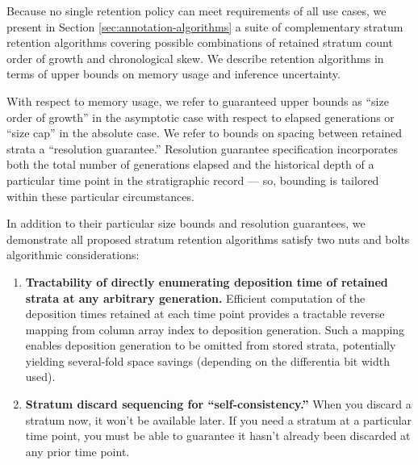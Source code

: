 Because no single retention policy can meet requirements of all use cases, we present in Section \ref{sec:annotation-algorithms} a suite of complementary stratum retention algorithms covering possible combinations of retained stratum count order of growth and chronological skew.
We describe retention algorithms in terms of upper bounds on memory usage and inference uncertainty.

With respect to memory usage, we refer to guaranteed upper bounds as ``size order of growth'' in the asymptotic case with respect to elapsed generations or ``size cap'' in the absolute case.
We refer to bounds on spacing between retained strata a ``resolution guarantee.''
Resolution guarantee specification incorporates both the total number of generations elapsed and the historical depth of a particular time point in the stratigraphic record --- so, bounding is tailored within these particular circumstances.

In addition to their particular size bounds and resolution guarantees, we demonstrate all proposed stratum retention algorithms satisfy two nuts and bolts algorithmic considerations:
\begin{enumerate}
\item \textbf{Tractability of directly enumerating deposition time of retained strata at any arbitrary generation.} Efficient computation of the deposition times retained at each time point provides a tractable reverse mapping from column array index to deposition generation.
  Such a mapping enables deposition generation to be omitted from stored strata, potentially yielding several-fold space savings (depending on the differentia bit width used).

\item \textbf{Stratum discard sequencing for ``self-consistency.''} 
  When you discard a stratum now, it won't be available later.
  If you need a stratum at a particular time point, you must be able to guarantee it hasn't already been discarded at any prior time point.

\end{enumerate}


